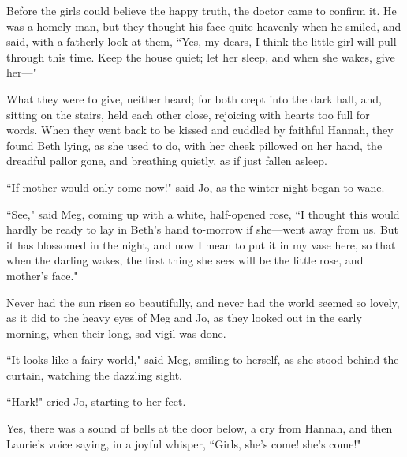 Before the girls could believe the happy truth, the doctor came to
confirm it. He was a homely man, but they thought his face quite
heavenly when he smiled, and said, with a fatherly look at them, ``Yes,
my dears, I think the little girl will pull through this time. Keep the
house quiet; let her sleep, and when she wakes, give her---"

What they were to give, neither heard; for both crept into the dark
hall, and, sitting on the stairs, held each other close, rejoicing with
hearts too full for words. When they went back to be kissed and cuddled
by faithful Hannah, they found Beth lying, as she used to do, with her
cheek pillowed on her hand, the dreadful pallor gone, and breathing
quietly, as if just fallen asleep.

``If mother would only come now!" said Jo, as the winter night began to
wane.

``See," said Meg, coming up with a white, half-opened rose, ``I thought
this would hardly be ready to lay in Beth's hand
to-morrow if she---went away from us. But it has blossomed in the night,
and now I mean to put it in my vase here, so that when the darling
wakes, the first thing she sees will be the little rose, and
mother's face."

Never had the sun risen so beautifully, and never had the world seemed
so lovely, as it did to the heavy eyes of Meg and Jo, as they looked out
in the early morning, when their long, sad vigil was done.

``It looks like a fairy world," said Meg, smiling to herself, as she
stood behind the curtain, watching the dazzling sight.

``Hark!" cried Jo, starting to her feet.

Yes, there was a sound of bells at the door below, a cry from Hannah,
and then Laurie's voice saying, in a joyful whisper,
``Girls, she's come! she's come!"
